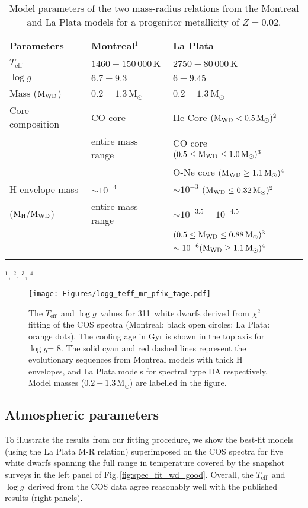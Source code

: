 \documentclass[fleqn,usenatbib, useAMS]{mnras}
\newcommand{\Teff}{\mbox{$T_{\mathrm{eff}}$}}
\newcommand{\logg}{\mbox{$\log g$}}
\newcommand{\Msun}{\mbox{$\mathrm{M_\odot}$}}
\newcommand{\totalnumber}{311}
\begin{document}
\begin{table}
\centering
\caption{Model parameters of the two mass-radius relations from the Montreal and La Plata models for a progenitor metallicity of $Z=0.02$. }
\addtolength{\tabcolsep}{-3pt}
\begin{tabular}{lll}
\hline
Parameters	&	Montreal$^{1}$	&	La Plata\\
\hline
\Teff	&	$1460-150\,000$\,K	&	$2750-80\,000$\,K\\
\logg 	&	$6.7-9.3$	&	$6-9.45$\\
Mass ($\rm{M_{WD}}$)	&	$0.2-1.3$\,\Msun	&	$0.2-1.3$\,\Msun\\
Core composition	&	CO core 	&	He Core $(\rm{M_{WD}}<0.5\,\Msun)^{2}$\\
	& entire mass range		&	CO core $(0.5 \leq \rm{M_{WD}} \leq 1.0 \,\Msun)^{3}$\\
	&		&	O-Ne core $(\rm{M_{WD}}\geq 1.1\,\Msun)^{4}$\\
H envelope mass 	&	$\sim10^{-4}$ 	&	$\sim10^{-3}$ ($\rm{M_{WD}} \leq 0.32\,\Msun)^{2}$\\
($\rm{M_{H}}/M_{WD}$)	&	entire mass range 	&	$\sim10^{-3.5}-10^{-4.5}$ \\
&&$(0.5 \leq \rm{M_{WD}} \leq 0.88\,\Msun)^{3}$\\
	&	 	& $\sim10^{-6} (\rm{M_{WD}}\geq 1.1\,\Msun)^{4}$\\
\hline
\label{tab:M-Rrel}
\end{tabular}
\footnotesize\flushleft
$^{1}$\cite{Bedard2020}, $^{2}$\cite{Althaus2013}, $^{3}$\cite{Camisassa2016}, $^{4}$\cite{Camisassa2019}
\end{table}

\begin{figure}
\centering
\texttt{[image: Figures/logg\_teff\_mr\_pfix\_tage.pdf]}
\caption{The \Teff\ and \logg\ values for \totalnumber\ white dwarfs derived from $\chi^{2}$ fitting of the COS spectra (Montreal: black open circles; La Plata: orange dots). The cooling age in Gyr is shown in the top axis for \logg = 8. The solid cyan and red dashed lines represent the evolutionary sequences from Montreal models with thick H envelopes, and La Plata models for spectral type DA respectively. Model masses ($0.2-1.3$\,\Msun) are labelled in the figure.}
\label{fig:teff_logg}
\end{figure}


\subsection{Atmospheric parameters}\label{sec:params}
To illustrate the results from our fitting procedure, we show the best-fit models (using the La Plata M-R relation) superimposed on the COS spectra for five white dwarfs spanning the full range in temperature covered by the snapshot surveys in the left panel of Fig.\,\ref{fig:spec_fit_wd_good}. Overall, the \Teff\ and \logg\ derived from the COS data agree reasonably well with the published results (right panels). 
\end{document}
